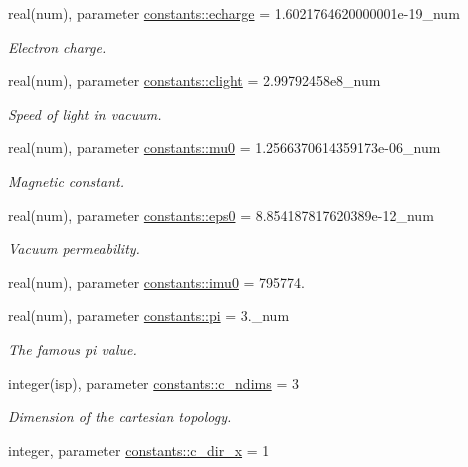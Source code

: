 \begin{DoxyCompactItemize}
real(num), parameter \hyperlink{namespaceconstants_af0f1098f6be55eab4174890ed5caaf98}{constants\+::echarge} = 1.\+6021764620000001e-\/19\+\_\+num
\begin{DoxyCompactList}\small\item\em Electron charge. \end{DoxyCompactList}\item 
real(num), parameter \hyperlink{namespaceconstants_ac23d8857383002cada2aa571fd859533}{constants\+::clight} = 2.\+99792458e8\+\_\+num
\begin{DoxyCompactList}\small\item\em Speed of light in vacuum. \end{DoxyCompactList}\item 
real(num), parameter \hyperlink{namespaceconstants_adf2453bfeefbefa1135a81f4ddfe4d6d}{constants\+::mu0} = 1.\+2566370614359173e-\/06\+\_\+num
\begin{DoxyCompactList}\small\item\em Magnetic constant. \end{DoxyCompactList}\item 
real(num), parameter \hyperlink{namespaceconstants_a4fc609b4d7bd5d8e45e57bd0ba7c5e29}{constants\+::eps0} = 8.\+854187817620389e-\/12\+\_\+num
\begin{DoxyCompactList}\small\item\em Vacuum permeability. \end{DoxyCompactList}\item 
real(num), parameter \hyperlink{namespaceconstants_abcf10ccefe6023e0401ce1b4a5f74fb5}{constants\+::imu0} = 795774.
\item 
real(num), parameter \hyperlink{namespaceconstants_a736c2860cb0585043ad4abcd1c3352b1}{constants\+::pi} = 3.\+\_\+num
\begin{DoxyCompactList}\small\item\em The famous pi value. \end{DoxyCompactList}\item 
integer(isp), parameter \hyperlink{namespaceconstants_aad8d45b739c41f2926fd2accb3de9dd2}{constants\+::c\+\_\+ndims} = 3
\begin{DoxyCompactList}\small\item\em Dimension of the cartesian topology. \end{DoxyCompactList}\item 
integer, parameter \hyperlink{namespaceconstants_a8e38e74e9723ce351e7a20787e649e89}{constants\+::c\+\_\+dir\+\_\+x} = 1

\end{DoxyCompactItemize}
